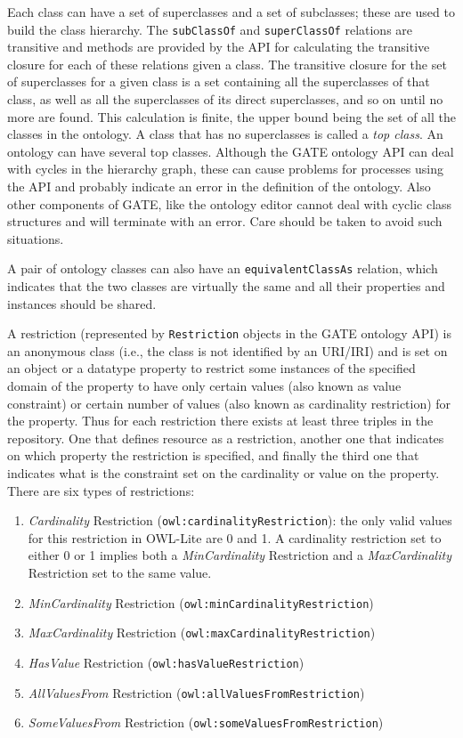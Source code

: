 Each class can have a set of superclasses and a set of subclasses;
these are used to build the class hierarchy. The \texttt{subClassOf} and
\texttt{superClassOf} relations are transitive and methods are provided by the
API for calculating the transitive closure for each of these relations
given a class. The transitive closure for the set of superclasses for
a given class is a set containing all the superclasses of that class,
as well as all the superclasses of its direct superclasses, and so on
until no more are found. This calculation is finite, the upper bound
being the set of all the classes in the ontology. A class that has no
superclasses is called a \emph{top class}. An ontology can have several top
classes. Although the GATE ontology API can deal with cycles
in the hierarchy graph, these can cause problems for processes using
the API and probably indicate an error in the definition of the
ontology. Also other components of GATE, like the ontology editor 
cannot deal with cyclic class structures and will terminate with an 
error. Care should be taken to avoid such situations.

A pair of ontology classes can also have an \texttt{equivalentClassAs} relation, 
which indicates that the two
classes are virtually the same and all their properties and instances
should be shared.

A restriction (represented by \verb!Restriction! objects in the GATE
ontology API) is an anonymous class (i.e., the class is not identified by
an URI/IRI) and is set on an object or a
datatype property to restrict some instances of the specified domain
of the property to have only certain values (also known as value
constraint) or certain number of values (also known as cardinality
restriction) for the property. Thus for each restriction there exists
at least three triples in the repository. One that defines resource as
a restriction, another one that indicates on which property the
restriction is specified, and finally the third one that indicates what
is the constraint set on the cardinality or value on the property.
There are six types of restrictions:

\begin{enumerate}
\item \emph{Cardinality} Restriction (\verb!owl:cardinalityRestriction!): the only valid values for this restriction in OWL-Lite are 0 and 1. A cardinality restriction set to either 0 or 1 implies both a \emph{MinCardinality} Restriction and a \emph{MaxCardinality} Restriction
 set to the same value. 
\item \emph{MinCardinality} Restriction (\verb!owl:minCardinalityRestriction!)
\item \emph{MaxCardinality} Restriction (\verb!owl:maxCardinalityRestriction!)
\item \emph{HasValue} Restriction (\verb!owl:hasValueRestriction!)
\item \emph{AllValuesFrom} Restriction (\verb!owl:allValuesFromRestriction!)
\item \emph{SomeValuesFrom} Restriction (\verb!owl:someValuesFromRestriction!)
\end{enumerate}

